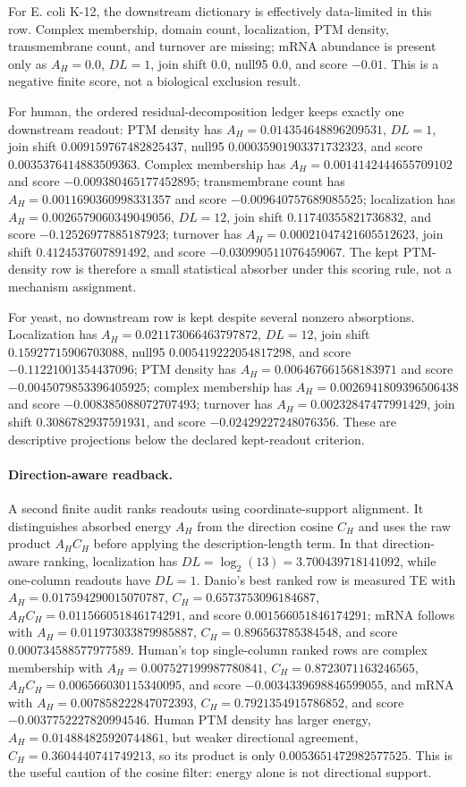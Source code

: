 For E. coli K-12, the downstream dictionary is effectively data-limited in this row.  Complex membership, domain count, localization, PTM density, transmembrane count, and turnover are missing; mRNA abundance is present only as $A_H=0.0$, $DL=1$, join shift $0.0$, null95 $0.0$, and score $-0.01$.  This is a negative finite score, not a biological exclusion result.

For human, the ordered residual-decomposition ledger keeps exactly one downstream readout: PTM density has $A_H=0.014354648896209531$, $DL=1$, join shift $0.009159767482825437$, null95 $0.00035901903371732323$, and score $0.0035376414883509363$.  Complex membership has $A_H=0.0014142444655709102$ and score $-0.009380465177452895$; transmembrane count has $A_H=0.0011690360998331357$ and score $-0.009640757689085525$; localization has $A_H=0.0026579060349049056$, $DL=12$, join shift $0.11740355821736832$, and score $-0.12526977885187923$; turnover has $A_H=0.00021047421605512623$, join shift $0.4124537607891492$, and score $-0.030990511076459067$.  The kept PTM-density row is therefore a small statistical absorber under this scoring rule, not a mechanism assignment.

For yeast, no downstream row is kept despite several nonzero absorptions.  Localization has $A_H=0.021173066463797872$, $DL=12$, join shift $0.15927715906703088$, null95 $0.005419222054817298$, and score $-0.11221001354437096$; PTM density has $A_H=0.006467661568183971$ and score $-0.0045079853396405925$; complex membership has $A_H=0.0026941809396506438$ and score $-0.008385088072707493$; turnover has $A_H=0.00232847477991429$, join shift $0.3086782937591931$, and score $-0.02429227248076356$.  These are descriptive projections below the declared kept-readout criterion.

\paragraph{Direction-aware readback.}
A second finite audit ranks readouts using coordinate-support alignment.  It distinguishes absorbed energy $A_H$ from the direction cosine $C_H$ and uses the raw product $A_HC_H$ before applying the description-length term.  In that direction-aware ranking, localization has $DL=\log_2(13)=3.700439718141092$, while one-column readouts have $DL=1$.  Danio's best ranked row is measured TE with $A_H=0.017594290015070787$, $C_H=0.6573753096184687$, $A_HC_H=0.011566051846174291$, and score $0.001566051846174291$; mRNA follows with $A_H=0.011973033879985887$, $C_H=0.896563785384548$, and score $0.000734588577977589$.  Human's top single-column ranked rows are complex membership with $A_H=0.007527199987780841$, $C_H=0.8723071163246565$, $A_HC_H=0.006566030115340095$, and score $-0.0034339698846599055$, and mRNA with $A_H=0.007858222847072393$, $C_H=0.7921354915786852$, and score $-0.0037752227820994546$.  Human PTM density has larger energy, $A_H=0.014884825920744861$, but weaker directional agreement, $C_H=0.3604440741749213$, so its product is only $0.0053651472982577525$.  This is the useful caution of the cosine filter: energy alone is not directional support.

